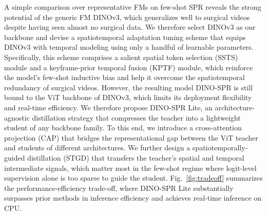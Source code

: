 A simple comparison over representative FMs on few-shot SPR reveals the strong
potential of the generic FM DINOv3, which generalizes well to surgical videos
despite having seen almost no surgical data. We therefore select DINOv3 as our
backbone and devise a spatiotemporal adaptation tuning scheme that equips
DINOv3 with temporal modeling using only a handful of learnable parameters. Specifically, this scheme comprises a salient spatial token selection (SSTS) module and a keyframe-prior temporal fusion (KPTF) module, which reinforce the model's few-shot inductive bias and help it overcome the spatiotemporal redundancy of surgical videos.
However, the resulting model DINO-SPR is still bound to the
ViT backbone of DINOv3, which limits its deployment flexibility and real-time
efficiency.
We therefore propose DINO-SPR Lite, an architecture-agnostic distillation
strategy that compresses the teacher into a lightweight student of any backbone
family.
To this end, we introduce a cross-attention projection (CAP) that bridges the
representational gap between the ViT teacher and students of different
architectures.
We further design a spatiotemporally-guided distillation (STGD) that transfers
the teacher's spatial and temporal intermediate signals, which matter most in
the few-shot regime where logit-level supervision alone is too sparse to guide
the student.
Fig.~\ref{fig:tradeoff} summarizes the performance-efficiency
trade-off, where DINO-SPR Lite substantially surpasses prior methods in
inference efficiency and achieves real-time inference on CPU.





